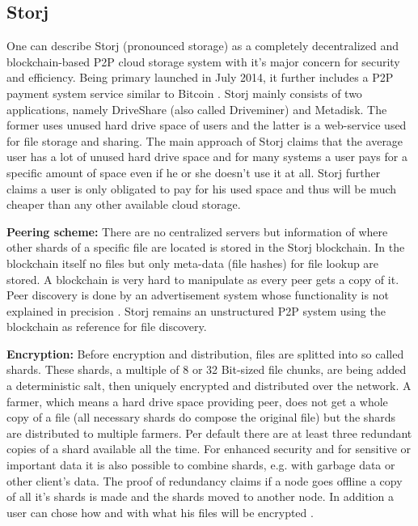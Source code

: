 \subsection{Storj}
One can describe Storj (pronounced storage) as a completely decentralized and blockchain-based P2P cloud storage system with it's major concern for security and efficiency. Being primary launched in July 2014, it further includes a P2P payment system service similar to Bitcoin \cite{storj:blog:what_is_storj}. Storj mainly consists of two applications, namely DriveShare (also called Driveminer) and Metadisk. The former uses unused hard drive space of users and the latter is a web-service used for file storage and sharing. The main approach of Storj claims that the average user has a lot of unused hard drive space and for many systems a user pays for a specific amount of space even if he or she doesn't use it at all. Storj further claims a user is only obligated to pay for his used space and thus will be much cheaper than any other available cloud storage.

\textbf{Peering scheme:} There are no centralized servers but information of where other shards of a specific file are located is stored in the Storj blockchain. In the blockchain itself no files but only meta-data (file hashes) for file lookup are stored. A blockchain is very hard to manipulate as every peer gets a copy of it. Peer discovery is done by an advertisement system whose functionality is not explained in precision \cite{storj:PDF}. Storj remains an unstructured P2P system using the blockchain as reference for file discovery.

\textbf{Encryption:} Before encryption and distribution, files are splitted into so called shards. These shards, a multiple of 8 or 32 Bit-sized file chunks, are being added a deterministic salt, then uniquely encrypted and distributed over the network. A farmer, which means a hard drive space providing peer, does not get a whole copy of a file (all necessary shards do compose the original file) but the shards are distributed to multiple farmers. Per default there are at least three redundant copies of a shard available all the time. For enhanced security and for sensitive or important data it is also possible to combine shards, e.g. with garbage data or other client's data. The proof of redundancy claims if a node goes offline a copy of all it's shards is made and the shards moved to another node. In addition a user can chose how and with what his files will be encrypted  \cite{storj:PDF}.

